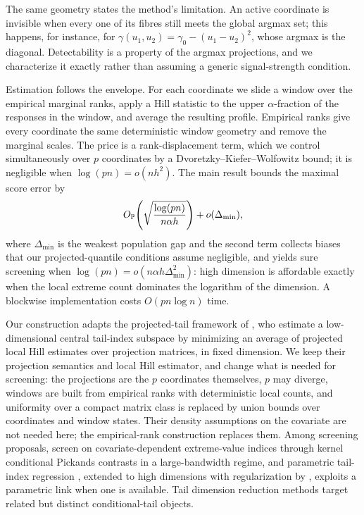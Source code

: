 The same geometry states the method's limitation. An active coordinate is
invisible when every one of its fibres still meets the global argmax set;
this happens, for instance, for $\gamma(u_1,u_2)=\gamma_0-(u_1-u_2)^2$,
whose argmax is the diagonal. Detectability is a property of the argmax
projections, and we characterize it exactly rather than assuming a generic
signal-strength condition.

Estimation follows the envelope. For each coordinate we slide a window over
the empirical marginal ranks, apply a Hill statistic to the upper
$\alpha$-fraction of the responses in the window, and average the resulting
profile. Empirical ranks give every coordinate the same deterministic window
geometry and remove the marginal scales. The price is a rank-displacement
term, which we control simultaneously over $p$ coordinates by a
Dvoretzky--Kiefer--Wolfowitz bound; it is negligible when $\log(pn)=o(nh^2)$.
The main result bounds the maximal score error by
\[
 O_{\mathbb P}\!\left(\sqrt{\frac{\log(pn)}{n\alpha h}}\right)+o(\Delta_{\min}),
\]
where $\Delta_{\min}$ is the weakest population gap and the second term
collects biases that our projected-quantile conditions assume
negligible, and yields sure screening when
$\log(pn)=o(n\alpha h\Delta_{\min}^2)$: high dimension is affordable
exactly when the local extreme count dominates the logarithm of the
dimension. A blockwise implementation costs $O(pn\log n)$ time.

Our construction adapts the projected-tail framework of
\citet{gardesPodgorny2025}, who estimate a low-dimensional central tail-index
subspace by minimizing an average of projected local Hill estimates over
projection matrices, in fixed dimension. We keep their projection semantics
and local Hill estimator, and change what is needed for screening: the
projections are the $p$ coordinates themselves, $p$ may diverge, windows are
built from empirical ranks with deterministic local counts, and uniformity
over a compact matrix class is replaced by union bounds over coordinates and
window states. Their density assumptions on the covariate are not needed
here; the empirical-rank construction replaces them. Among screening
proposals, \citet{yoshidaUmezu2026} screen on covariate-dependent
extreme-value indices through kernel conditional Pickands contrasts in a
large-bandwidth regime, and parametric tail-index regression \citep{wangTsai2009}, extended to
high dimensions with regularization by \citet{sasakiTaoWang2026},
exploits a parametric link when one is available. Tail dimension reduction methods
\citep{gardes2018,aghbalouEtAl2024,bousebataEtAl2023,arbelEtAl2024} target
related but distinct conditional-tail objects.

